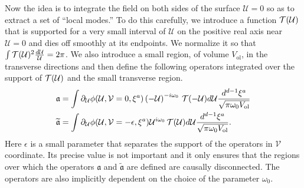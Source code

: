 \documentclass[12pt]{article}
\newcommand{\be}{\begin{equation}}
\newcommand{\ee}{\end{equation}}
\def \anh {\mathfrak{a}}
\def \tildanh {\widetilde{\mathfrak{a}}}
\def\uent{\mathcal{U}}
\def\vent{\mathcal{V}}
\def\xent{\mathcal{\xi}}
\def\tune{{\cal T}}
\def\vol{ V_{\text{ol}}}
\begin{document}
Now the idea is to integrate the field on both sides of the surface $\uent = 0$ so as to extract a set of ``local modes.''
To do this carefully, we introduce a function $\tune(\uent)$ that is supported for a very small interval of $\uent$ on the positive real axis near $\uent = 0$ and dies off smoothly at its endpoints. We normalize it so that $\int \tune(\uent)^2 {d \uent \over \uent} = 2 \pi$. We also introduce a small region, of volume $\vol$, in the transverse directions and then define the following operators integrated over the support of $\tune(\uent)$ and the small transverse region.
\be
\label{defnearhormodes}
\begin{split}
&\anh = \int   \partial_{\uent} \phi(\uent, \vent=0, \xent^a) \left(-\uent \right)^{-i \omega_0} \,  \tune(-\uent) d \uent {d^{d-1} \xent^a \over \sqrt{\pi \omega_0 \vol} } \\
&\tildanh =\int  \partial_\uent \phi(\uent,\vent=-\epsilon,\xent^a) \uent^{i \omega_0} \, \tune(\uent) d \uent {d^{d-1} \xent^a \over  \sqrt{\pi \omega_0 \vol}}.
\end{split}
\ee
Here $\epsilon$ is a small parameter that separates the support of the operators in $\vent$ coordinate. Its precise value is not important and it only ensures that the regions over which the operators $\anh$ and $\tildanh$ are defined are causally disconnected.   The operators are also implicitly dependent on the choice of the parameter  $\omega_0$.
\end{document}
